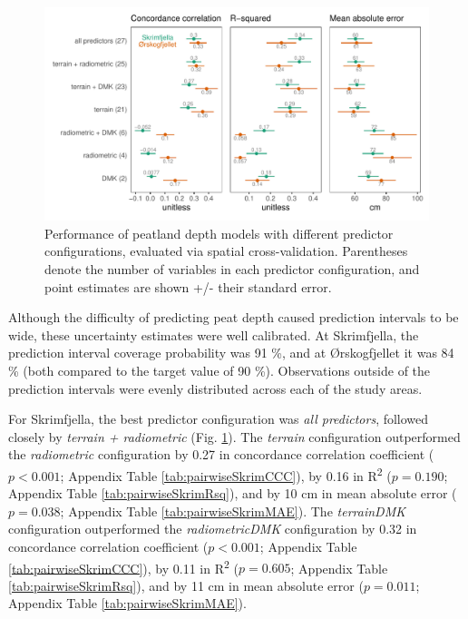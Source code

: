 \documentclass[soil, manuscript]{copernicus}
\begin{document}
\begin{figure}
\includegraphics[width=1\linewidth]{figures/modelmetrics} \caption{Performance of peatland depth models with different predictor configurations, evaluated via spatial cross-validation. Parentheses denote the number of variables in each predictor configuration, and point estimates are shown +/- their standard error.}\label{fig:modelMetrics}
\end{figure}

Although the difficulty of predicting peat depth caused prediction intervals to be wide, these uncertainty estimates were well calibrated.
At Skrimfjella, the prediction interval coverage probability was 91 \%, and at Ørskogfjellet it was 84 \% (both compared to the target value of 90 \%).
Observations outside of the prediction intervals were evenly distributed across each of the study areas.

For Skrimfjella, the best predictor configuration was \emph{all predictors}, followed closely by \emph{terrain + radiometric} (Fig. \ref{fig:modelMetrics}).
The \emph{terrain} configuration outperformed the \emph{radiometric} configuration by 0.27 in concordance correlation coefficient (\(p < 0.001\); Appendix Table \ref{tab:pairwiseSkrimCCC}), by 0.16 in R\textsuperscript{2} (\(p = 0.190\); Appendix Table \ref{tab:pairwiseSkrimRsq}), and by 10 cm in mean absolute error (\(p = 0.038\); Appendix Table \ref{tab:pairwiseSkrimMAE}).
The \emph{terrainDMK} configuration outperformed the \emph{radiometricDMK} configuration by 0.32 in concordance correlation coefficient (\(p < 0.001\); Appendix Table \ref{tab:pairwiseSkrimCCC}), by 0.11 in R\textsuperscript{2} (\(p = 0.605\); Appendix Table \ref{tab:pairwiseSkrimRsq}), and by 11 cm in mean absolute error (\(p = 0.011\); Appendix Table \ref{tab:pairwiseSkrimMAE}).
\end{document}

